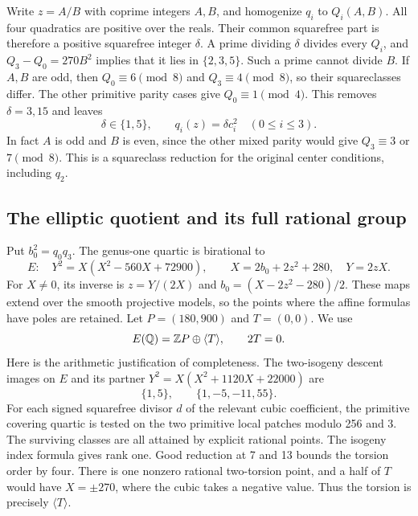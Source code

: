 Write $z=A/B$ with coprime integers $A,B$, and homogenize $q_i$ to
$Q_i(A,B)$. All four quadratics are positive over the reals. Their
common squarefree part is therefore a positive squarefree integer
$\delta$. A prime dividing $\delta$ divides every $Q_i$, and
$Q_3-Q_0=270B^2$ implies that it lies in $\{2,3,5\}$. Such a prime
cannot divide $B$. If $A,B$ are odd, then $Q_0\equiv6\pmod8$ and
$Q_3\equiv4\pmod8$, so their squareclasses differ. The other
primitive parity cases give $Q_0\equiv1\pmod4$. This removes
$\delta=3,15$ and leaves
\begin{equation}\label{eq:t10-delta}
 \delta\in\{1,5\},\qquad q_i(z)=\delta c_i^2\quad(0\leq i\leq3).
\end{equation}
In fact $A$ is odd and $B$ is even, since the other mixed parity
would give $Q_3\equiv3$ or $7\pmod8$. This is a squareclass reduction
for the original center conditions, including $q_2$.

\subsection{The elliptic quotient and its full rational group}

Put $b_0^2=q_0q_3$. The genus-one quartic is birational to
\begin{equation}\label{eq:t10-E}
 E:\quad Y^2=X(X^2-560X+72900),\qquad
 X=2b_0+2z^2+280,\quad Y=2zX.
\end{equation}
For $X\ne0$, its inverse is $z=Y/(2X)$ and
$b_0=(X-2z^2-280)/2$. These maps extend over the smooth projective
models, so the points where the affine formulas have poles are retained.
Let $P=(180,900)$ and $T=(0,0)$. We use
\begin{equation}\label{eq:t10-full-group}
 E(\mathbb Q)=\mathbb Z P\oplus\langle T\rangle,\qquad 2T=0.
\end{equation}
Here is the arithmetic justification of completeness. The two-isogeny
descent images on $E$ and its partner
$Y^2=X(X^2+1120X+22000)$ are
\[
 \{1,5\},\qquad \{1,-5,-11,55\}.
\]
For each signed squarefree divisor $d$ of the relevant cubic coefficient,
the primitive covering quartic is tested on the two primitive local
patches modulo 256 and 3. The surviving classes are all attained by
explicit rational points. The isogeny index formula gives rank one.
Good reduction at 7 and 13 bounds the torsion order by four. There is
one nonzero rational two-torsion point, and a half of $T$ would have
$X=\pm270$, where the cubic takes a negative value. Thus the torsion
is precisely $\langle T\rangle$.

